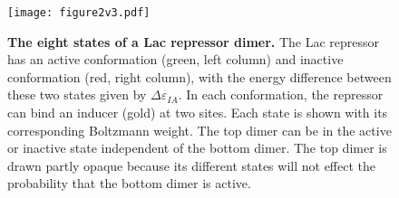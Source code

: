 \begin{figure}[h]
	\centering \texttt{[image: figure2v3.pdf]}
	\caption{{\bf The eight states of a Lac repressor dimer. } The Lac repressor has
		an active conformation (green, left column) and inactive conformation (red,
		right column), with the energy difference between these two states given by
		$\Delta \varepsilon_{IA}$. In each conformation, the repressor can bind an inducer (gold) at
		two sites. Each state is shown with its corresponding Boltzmann weight. The top
		dimer can be in the active or inactive state independent of the bottom dimer.
		The top dimer is drawn partly opaque because its different states will not
		effect the probability that the bottom dimer is active. %
	} \label{figrepressorInducerStates}
\end{figure}


